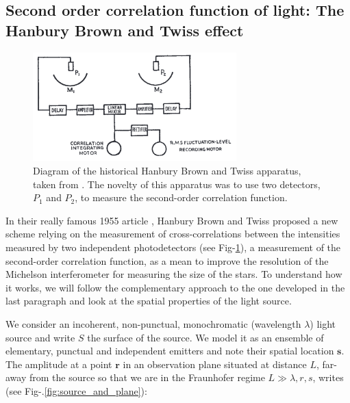


\subsection{Second order correlation function of light: The Hanbury Brown and Twiss effect}

\begin{figure}
    \centering
    \includegraphics[width=0.7\textwidth]{Fig/Chapter1/HBT_apparatus.png}
    \caption{Diagram of the historical Hanbury Brown and Twiss apparatus, taken from \cite{brown1956test}. The novelty of this apparatus was to use two detectors, $P_1$ and $P_2$, to measure the second-order correlation function.}
    \label{fig:HBT_apparatus}
\end{figure}

\label{sec:hbt_classical}

In their really famous 1955 article \cite{brown1954lxxiv}, Hanbury Brown and Twiss proposed a new scheme relying on the measurement of cross-correlations between the intensities measured by two independent photodetectors (see Fig-\ref{fig:HBT_apparatus}), \ie a measurement of the second-order correlation function, as a mean to improve the resolution of the Michelson interferometer for measuring the size of the stars. To understand how it works, we will follow the complementary approach to the one developed in the last paragraph and look at the spatial properties of the light source. 

We consider an incoherent, non-punctual, monochromatic (wavelength $\lambda$) light source and write $S$ the surface of the source. We model it as an ensemble of elementary, punctual and independent emitters and note their spatial location $\bm{s}$. The amplitude at a point $\bm{r}$ in an observation plane situated at distance $L$, far-away from the source so that we are in the Fraunhofer regime $L \gg \lambda, r,s$, writes (see Fig-.\ref{fig:source_and_plane}):

